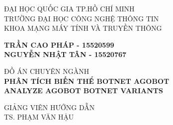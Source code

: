 
\begin{titlepage} %
  \newcommand{\HRule}{\rule{\linewidth}{0.5mm}} %

  \begin{center} %


  {\Large ĐẠI HỌC QUỐC GIA TP.HỒ CHÍ MINH}\\
  {\subtitlesize TRƯỜNG ĐẠI HỌC CÔNG NGHỆ THÔNG TIN}\\ %
  {\subtitlesize KHOA MẠNG MÁY TÍNH VÀ TRUYỀN THÔNG}\\ %


  \vfill

  \textbf{\large TRẦN CAO PHÁP - 15520599\\ NGUYỄN NHẬT TÂN - 15520767}\\


  \vfill

  {\Large ĐỒ ÁN CHUYÊN NGÀNH}\\[0.2cm] %
  \textbf{\LARGE PHÂN TÍCH BIẾN THỂ BOTNET AGOBOT}\\ %
  \textbf{\LARGE ANALYZE AGOBOT BOTNET VARIANTS}\\ %

  \vfill %

  {\large {GIẢNG VIÊN HƯỚNG DẪN} }\\
  \Large{TS. PHẠM VĂN HẬU} %


\end{center}
\end{titlepage}
